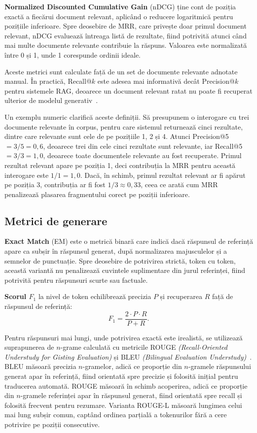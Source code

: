 \textbf{Normalized Discounted Cumulative Gain} (nDCG) ține cont de poziția exactă a fiecărui document relevant, aplicând o reducere logaritmică pentru pozițiile inferioare. Spre deosebire de MRR, care privește doar primul document relevant, nDCG evaluează întreaga listă de rezultate, fiind potrivită atunci când mai multe documente relevante contribuie la răspuns. Valoarea este normalizată între 0 și 1, unde 1 corespunde ordinii ideale.

Aceste metrici sunt calculate față de un set de documente relevante adnotate manual. În practică, Recall@$k$ este adesea mai informativă decât Precision@$k$ pentru sistemele RAG, deoarece un document relevant ratat nu poate fi recuperat ulterior de modelul generativ~\cite{karpukhin2020dpr}.

Un exemplu numeric clarifică aceste definiții. Să presupunem o interogare cu trei documente relevante în corpus, pentru care sistemul returnează cinci rezultate, dintre care relevante sunt cele de pe pozițiile 1, 2 și 4. Atunci Precision@5 $= 3/5 = 0{,}6$, deoarece trei din cele cinci rezultate sunt relevante, iar Recall@5 $= 3/3 = 1{,}0$, deoarece toate documentele relevante au fost recuperate. Primul rezultat relevant apare pe poziția 1, deci contribuția la MRR pentru această interogare este $1/1 = 1{,}0$. Dacă, în schimb, primul rezultat relevant ar fi apărut pe poziția 3, contribuția ar fi fost $1/3 \approx 0{,}33$, ceea ce arată cum MRR penalizează plasarea fragmentului corect pe poziții inferioare.

\subsection{Metrici de generare}

\textbf{Exact Match} (EM) este o metrică binară care indică dacă răspunsul de referință apare ca subșir în răspunsul generat, după normalizarea majusculelor și a semnelor de punctuație. Spre deosebire de potrivirea strictă, token cu token, această variantă nu penalizează cuvintele suplimentare din jurul referinței, fiind potrivită pentru răspunsuri scurte sau factuale.

\textbf{Scorul $F_1$} la nivel de token echilibrează precizia $P$ și recuperarea $R$ față de răspunsul de referință:
\begin{equation}
F_1 = \frac{2 \cdot P \cdot R}{P + R}.
\label{eq:f1}
\end{equation}

Pentru răspunsuri mai lungi, unde potrivirea exactă este irealistă, se utilizează suprapunerea de $n$-grame calculată cu metricile ROUGE \textit{(Recall-Oriented Understudy for Gisting Evaluation)} și BLEU \textit{(Bilingual Evaluation Understudy)}~\cite{gao2024retrievalaugmentedgenerationlargelanguage}. BLEU măsoară precizia $n$-gramelor, adică ce proporție din $n$-gramele răspunsului generat apar în referință, fiind orientată spre precizie și folosită inițial pentru traducerea automată. ROUGE măsoară în schimb acoperirea, adică ce proporție din $n$-gramele referinței apar în răspunsul generat, fiind orientată spre recall și folosită frecvent pentru rezumare. Varianta ROUGE-L măsoară lungimea celui mai lung subșir comun, captând ordinea parțială a tokenurilor fără a cere potrivire pe poziții consecutive.

